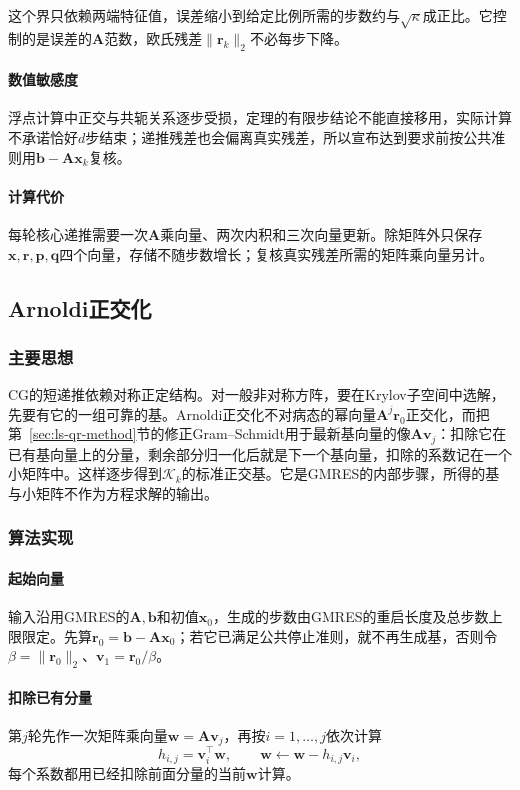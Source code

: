 这个界只依赖两端特征值，误差缩小到给定比例所需的步数约与$\sqrt\kappa$成正比。它控制的是误差的$\bm A$范数，欧氏残差$\lVert\bm r_k\rVert_2$不必每步下降。

\paragraph{数值敏感度}
浮点计算中正交与共轭关系逐步受损，定理的有限步结论不能直接移用，实际计算不承诺恰好$d$步结束；递推残差也会偏离真实残差，所以宣布达到要求前按公共准则用$\bm b-\bm A\bm x_k$复核。

\paragraph{计算代价}
每轮核心递推需要一次$\bm A$乘向量、两次内积和三次向量更新。除矩阵外只保存$\bm x,\bm r,\bm p,\bm q$四个向量，存储不随步数增长；复核真实残差所需的矩阵乘向量另计。

\subsection{Arnoldi正交化}
\label{sec:ls-arnoldi}

\subsubsection{主要思想}

CG的短递推依赖对称正定结构。对一般非对称方阵，要在Krylov子空间中选解，先要有它的一组可靠的基。Arnoldi正交化不对病态的幂向量$\bm A^j\bm r_0$正交化，而把第~\ref{sec:ls-qr-method}节的修正Gram--Schmidt用于最新基向量的像$\bm A\bm v_j$：扣除它在已有基向量上的分量，剩余部分归一化后就是下一个基向量，扣除的系数记在一个小矩阵中。这样逐步得到$\mathcal K_k$的标准正交基。它是GMRES的内部步骤，所得的基与小矩阵不作为方程求解的输出。

\subsubsection{算法实现}

\paragraph{起始向量}
输入沿用GMRES的$\bm A,\bm b$和初值$\bm x_0$，生成的步数由GMRES的重启长度及总步数上限限定。先算$\bm r_0=\bm b-\bm A\bm x_0$；若它已满足公共停止准则，就不再生成基，否则令$\beta=\lVert\bm r_0\rVert_2$、$\bm v_1=\bm r_0/\beta$。

\paragraph{扣除已有分量}
第$j$轮先作一次矩阵乘向量$\bm w=\bm A\bm v_j$，再按$i=1,\ldots,j$依次计算
\[
 h_{i,j}=\bm v_i^\top\bm w,\qquad \bm w\leftarrow\bm w-h_{i,j}\bm v_i,
\]
每个系数都用已经扣除前面分量的当前$\bm w$计算。


